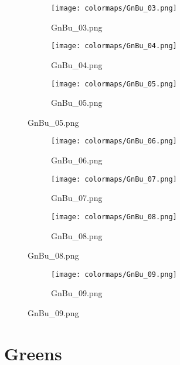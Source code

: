 \documentclass{article}%
\begin{document}
\begin{figure}[h!]%
\begin{subfigure}[b]{0.3\linewidth}%
\texttt{[image: colormaps/GnBu\_03.png]}%
\caption{GnBu\_03.png}%
\end{subfigure}%
\begin{subfigure}[b]{0.3\linewidth}%
\texttt{[image: colormaps/GnBu\_04.png]}%
\caption{GnBu\_04.png}%
\end{subfigure}%
\begin{subfigure}[b]{0.3\linewidth}%
\texttt{[image: colormaps/GnBu\_05.png]}%
\caption{GnBu\_05.png}%
\end{subfigure}%
\end{figure}

%
\hspace{1cm}\hfill%
\hspace{1cm}\hfill%
\hspace{1cm}\hfill%


\begin{figure}[h!]%
\begin{subfigure}[b]{0.3\linewidth}%
\texttt{[image: colormaps/GnBu\_06.png]}%
\caption{GnBu\_06.png}%
\end{subfigure}%
\begin{subfigure}[b]{0.3\linewidth}%
\texttt{[image: colormaps/GnBu\_07.png]}%
\caption{GnBu\_07.png}%
\end{subfigure}%
\begin{subfigure}[b]{0.3\linewidth}%
\texttt{[image: colormaps/GnBu\_08.png]}%
\caption{GnBu\_08.png}%
\end{subfigure}%
\end{figure}

%
\hspace{1cm}\hfill%


\begin{figure}[h!]%
\begin{subfigure}[b]{0.3\linewidth}%
\texttt{[image: colormaps/GnBu\_09.png]}%
\caption{GnBu\_09.png}%
\end{subfigure}%
\end{figure}

%
\newpage%
\section{Greens}%
\label{sec:Greens}%
\hspace{1cm}\hfill%
\hspace{1cm}\hfill%
\hspace{1cm}\hfill%
\end{document}
